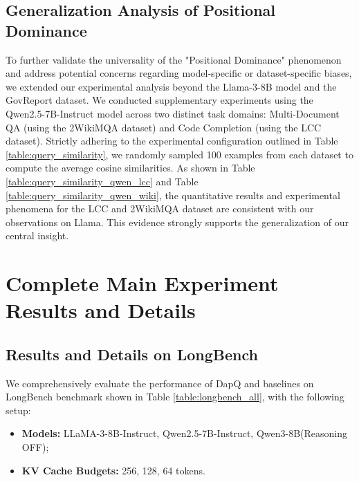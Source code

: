 \documentclass[11pt]{article}
\begin{document}
\subsection{Generalization Analysis of Positional Dominance}
To further validate the universality of the "Positional Dominance" phenomenon and address potential concerns regarding model-specific or dataset-specific biases, we extended our experimental analysis beyond the Llama-3-8B model and the GovReport dataset. We conducted supplementary experiments using the Qwen2.5-7B-Instruct model across two distinct task domains: Multi-Document QA (using the 2WikiMQA dataset) and Code Completion (using the LCC dataset). Strictly adhering to the experimental configuration outlined in Table \ref{table:query_similarity}, we randomly sampled 100 examples from each dataset to compute the average cosine similarities.  
As shown in Table \ref{table:query_similarity_qwen_lcc} and Table \ref{table:query_similarity_qwen_wiki}, the quantitative results and experimental phenomena for the LCC and 2WikiMQA dataset are consistent with our observations on Llama. This evidence strongly supports the generalization of our central insight.



\section{Complete Main Experiment Results and Details}
\label{Complete Experiment Results}

\subsection{Results and Details on LongBench}
\label{Complete Experiment Results on LongBench}
We comprehensively evaluate the performance of DapQ and baselines on LongBench benchmark shown in Table \ref{table:longbench_all}, with the following setup:
\begin{itemize}[leftmargin=*, nosep] %
    \item \textbf{Models:} LLaMA-3-8B-Instruct, Qwen2.5-7B-Instruct, Qwen3-8B(Reasoning OFF);
    \item \textbf{KV Cache Budgets:} 256, 128, 64 tokens.
\end{itemize}
\end{document}
